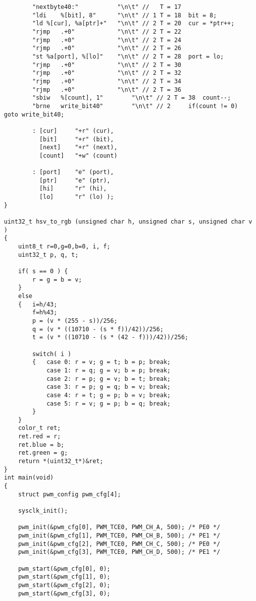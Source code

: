 \documentclass[a4paper]{article}
\begin{document}
\begin{lstlisting}
        "nextbyte40:"           "\n\t" //   T = 17
        "ldi    %[bit], 8"      "\n\t" // 1 T = 18  bit = 8;
        "ld %[cur], %a[ptr]+"   "\n\t" // 2 T = 20  cur = *ptr++;
        "rjmp   .+0"            "\n\t" // 2 T = 22
        "rjmp   .+0"            "\n\t" // 2 T = 24
        "rjmp   .+0"            "\n\t" // 2 T = 26
        "st %a[port], %[lo]"    "\n\t" // 2 T = 28  port = lo;
        "rjmp   .+0"            "\n\t" // 2 T = 30
        "rjmp   .+0"            "\n\t" // 2 T = 32
        "rjmp   .+0"            "\n\t" // 2 T = 34
        "rjmp   .+0"            "\n\t" // 2 T = 36
        "sbiw   %[count], 1"        "\n\t" // 2 T = 38  count--;
        "brne   write_bit40"        "\n\t" // 2     if(count != 0) goto write_bit40;

        : [cur]     "+r" (cur),
          [bit]     "+r" (bit),
          [next]    "+r" (next),
          [count]   "+w" (count)

        : [port]    "e" (port),
          [ptr]     "e" (ptr),
          [hi]      "r" (hi),
          [lo]      "r" (lo) );
}

uint32_t hsv_to_rgb (unsigned char h, unsigned char s, unsigned char v )
{
    uint8_t r=0,g=0,b=0, i, f;
    uint32_t p, q, t;

    if( s == 0 ) {
        r = g = b = v;
    }
    else
    {   i=h/43;
        f=h%43;
        p = (v * (255 - s))/256;
        q = (v * ((10710 - (s * f))/42))/256;
        t = (v * ((10710 - (s * (42 - f)))/42))/256;

        switch( i )
        {   case 0: r = v; g = t; b = p; break;
            case 1: r = q; g = v; b = p; break;
            case 2: r = p; g = v; b = t; break;
            case 3: r = p; g = q; b = v; break;
            case 4: r = t; g = p; b = v; break;
            case 5: r = v; g = p; b = q; break;
        }
    }
    color_t ret;
    ret.red = r;
    ret.blue = b;
    ret.green = g;
    return *(uint32_t*)&ret;
}
int main(void)
{
    struct pwm_config pwm_cfg[4];

    sysclk_init();

    pwm_init(&pwm_cfg[0], PWM_TCE0, PWM_CH_A, 500); /* PE0 */
    pwm_init(&pwm_cfg[1], PWM_TCE0, PWM_CH_B, 500); /* PE1 */
    pwm_init(&pwm_cfg[2], PWM_TCE0, PWM_CH_C, 500); /* PE0 */
    pwm_init(&pwm_cfg[3], PWM_TCE0, PWM_CH_D, 500); /* PE1 */

    pwm_start(&pwm_cfg[0], 0);
    pwm_start(&pwm_cfg[1], 0);
    pwm_start(&pwm_cfg[2], 0);
    pwm_start(&pwm_cfg[3], 0);




\end{lstlisting}
\end{document}
